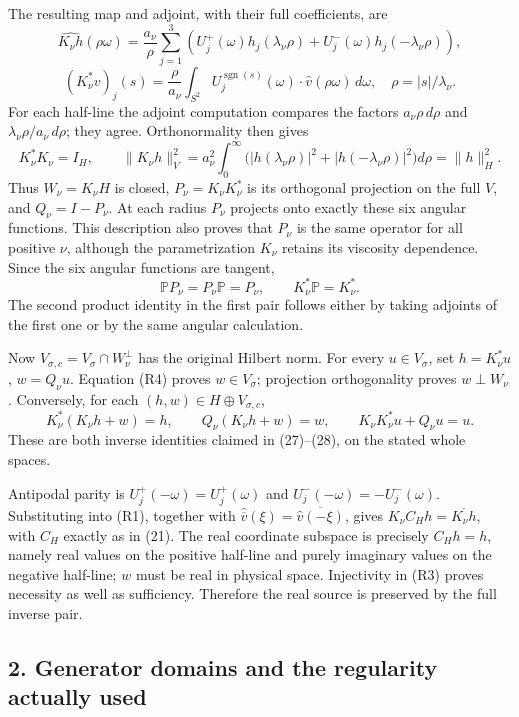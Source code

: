 The resulting map and adjoint, with their full coefficients, are \[
\widehat{K_\nu h}(\rho\omega)
=\frac{a_\nu}{\rho}\sum_{j=1}^3
\left(U_j^+(\omega)h_j(\lambda_\nu\rho)
+U_j^-(\omega)h_j(-\lambda_\nu\rho)\right),
\tag{R1}
\] \[
(K_\nu^*v)_j(s)
=\frac{\rho}{a_\nu}\int_{S^2}U_j^{\operatorname{sgn}(s)}(\omega)
\cdot\widehat v(\rho\omega)\,d\omega,
\quad \rho=|s|/\lambda_\nu.
\tag{R2}
\] For each half-line the adjoint computation compares the factors \(a_\nu\rho\,d\rho\) and \(\lambda_\nu\rho/a_\nu\,d\rho\); they agree. Orthonormality then gives \[
K_\nu^*K_\nu=I_H,
\qquad \|K_\nu h\|_V^2
=a_\nu^2\int_0^\infty
\bigl(|h(\lambda_\nu\rho)|^2+|h(-\lambda_\nu\rho)|^2\bigr)d\rho
=\|h\|_H^2.
\tag{R3}
\] Thus \(W_\nu=K_\nu H\) is closed, \(P_\nu=K_\nu K_\nu^*\) is its orthogonal projection on the full \(V\), and \(Q_\nu=I-P_\nu\). At each radius \(P_\nu\) projects onto exactly these six angular functions. This description also proves that \(P_\nu\) is the same operator for all positive \(\nu\), although the parametrization \(K_\nu\) retains its viscosity dependence. Since the six angular functions are tangent, \[
\mathbb P P_\nu=P_\nu\mathbb P=P_\nu,
\qquad K_\nu^*\mathbb P=K_\nu^*.
\tag{R4}
\] The second product identity in the first pair follows either by taking adjoints of the first one or by the same angular calculation.

Now \(V_{\sigma,c}=V_\sigma\cap W_\nu^\perp\) has the original Hilbert norm. For every \(u\in V_\sigma\), set \(h=K_\nu^*u\), \(w=Q_\nu u\). Equation (R4) proves \(w\in V_\sigma\); projection orthogonality proves \(w\perp W_\nu\). Conversely, for each \((h,w)\in H\oplus V_{\sigma,c}\), \[
K_\nu^*(K_\nu h+w)=h,
\qquad Q_\nu(K_\nu h+w)=w,
\qquad K_\nu K_\nu^*u+Q_\nu u=u.
\tag{R5}
\] These are both inverse identities claimed in (27)--(28), on the stated whole spaces.

Antipodal parity is \(U_j^+(-\omega)=U_j^+(\omega)\) and \(U_j^-(-\omega)=-U_j^-(\omega)\). Substituting into (R1), together with \(\widehat{\overline v}(\xi)=\overline{\widehat v(-\xi)}\), gives \(K_\nu C_Hh=\overline{K_\nu h}\), with \(C_H\) exactly as in (21). The real coordinate subspace is precisely \(C_Hh=h\), namely real values on the positive half-line and purely imaginary values on the negative half-line; \(w\) must be real in physical space. Injectivity in (R3) proves necessity as well as sufficiency. Therefore the real source is preserved by the full inverse pair.

\subsection*{2. Generator domains and the regularity actually used}

